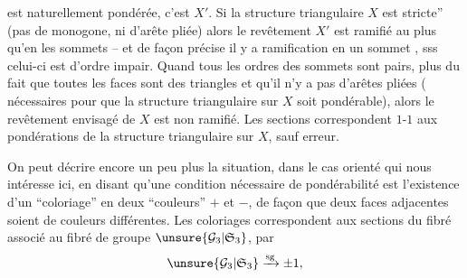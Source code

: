 est naturellement pondérée, c'est $X'$. Si la structure triangulaire $X$ est  stricte'' (pas de monogone, ni d'arête pliée) alors le revêtement $X'$ est ramifié au plus qu'en les sommets -- et de façon précise  il y a ramification en un sommet , sss celui-ci est d'ordre impair. Quand tous les ordres des sommets sont pairs,  plus du fait que toutes les faces sont des triangles et qu'il n'y a pas d'arêtes pliées ( nécessaires pour que la structure  triangulaire sur $X$ soit pondérable), alors le revêtement envisagé de $X$ est non ramifié. Les sections correspondent $1$-$1$ aux pondérations de la structure triangulaire sur $X$, sauf erreur.

On peut décrire encore un peu plus la situation, dans  le cas orienté qui nous intéresse ici, en disant qu'une condition nécessaire de pondérabilité est l'existence d'un ``coloriage'' en deux ``couleurs'' $+$ et $-$, de façon que deux faces adjacentes soient de couleurs différentes. Les coloriages correspondent aux sections du fibré  associé au fibré de groupe $\unsure{\mathcal G_3|\mathfrak S_3}$, par
\[
\unsure{\mathcal G_3|\mathfrak S_3}\xrightarrow{\mathrm{sg}}\pm1,
\]
 

